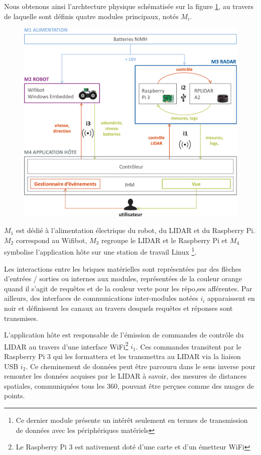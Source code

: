 Nous obtenons ainsi l'archtecture physique schématisée sur la figure \ref{fig:archiphy}, au travers de laquelle sont définis quatre modules principaux, notés $M_{i}$.

\begin{figure}[h]
  \centering
    \includegraphics[width=.9\linewidth]{figures/archi-phy}  
  \label{fig:archiphy}
\end{figure}

$M_{1}$ est dédié à l'alimentation électrique du robot, du LIDAR et du Raspberry Pi.
$M_{2}$ correspond au Wifibot, $M_{3}$ regroupe le LIDAR et le Raspberry Pi et $M_{4}$ symbolise l'application hôte sur une station de travail Linux
\footnote{Ce dernier module présente un intérêt seulement en termes de transmission de données avec les périphériques matériels}.

Les interactions entre les briques matérielles sont représentées par des flèches d'entrées / sorties ou internes aux modules, représentées de la couleur orange quand il s'agit de requêtes et de la couleur verte pour 
les répo,ses afférentes. 
Par ailleurs, des interfaces de communications inter-modules notées $i_{i}$ apparaissent en noir et définissent les canaux au travers desquels requêtes et réponses sont transmises. 

L'application hôte est responsable de l'émission de commandes de contrôle du LIDAR au travers d'une interface WiFi\footnote{Le Raspberry Pi 3 est nativement doté d'une carte et d'un émetteur WiFi} $i_{1}$. 
Ces commandes transitent par le Raspberry Pi 3 qui les formattera et les transmettra au LIDAR via la liaison USB $i_{2}$. 
Ce cheminement de données peut être parcouru dans le sens inverse pour remonter les données acquises par le LIDAR à savoir, 
des mesures de distances spatiales, communiquées tous les 360\degre, pouvant être perçues comme des nuages de points. 

